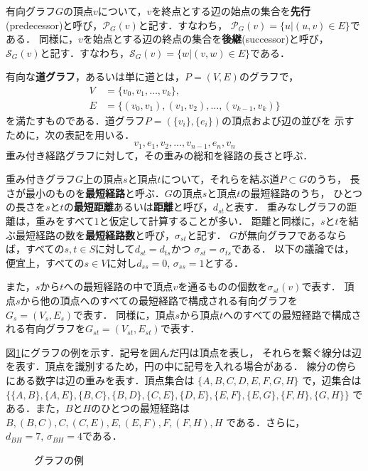 有向グラフ$G$の頂点$v$について，$v$を終点とする辺の始点の集合を\textbf{先行}
(predecessor)と呼び，$\mathcal{P}_G(v)$と記す．すなわち，
$\mathcal{P}_G(v)=\{u|(u,v)\in E\}$である．
同様に，$v$を始点とする辺の終点の集合を\textbf{後継}(successor)と呼び，
$\mathcal{S}_G(v)$と記す．すなわち，$\mathcal{S}_G(v)=\{w|(v,w)\in E\}$である．

有向な\textbf{道グラフ}，あるいは単に道とは，$P=(V,E)$のグラフで，
\begin{equation*}
  \begin{aligned}
  V&=\{v_0,v_1,\ldots,v_k\}, \\
  E&=\{(v_0,v_1),(v_1,v_2),\ldots,(v_{k-1},v_k)\}
  \end{aligned}
\end{equation*}
を満たすものである．道グラフ$P=(\{v_i\},\{e_i\})$の頂点および辺の並びを
示すために，次の表記を用いる．
\[ v_1,e_1,v_2,\ldots,v_{n-1},e_n,v_n \]
重み付き経路グラフに対して，その重みの総和を経路の長さと呼ぶ．

重み付きグラフ$G$上の頂点$s$と頂点$t$について，それらを結ぶ道$P\subset G$のうち，
長さが最小のものを\textbf{最短経路}と呼ぶ．$G$の頂点$s$と頂点$t$の最短経路のうち，
ひとつの長さを$s$と$t$の\textbf{最短距離}あるいは\textbf{距離}と呼び，$d_{st}$と表す．
重みなしグラフの距離は，重みをすべて$1$と仮定して計算することが多い．
距離と同様に，$s$と$t$を結ぶ最短経路の数を\textbf{最短経路数}と呼び，$\sigma_{st}$と記す．
$G$が無向グラフであるならば，すべての$s,t\in S$に対して$d_{st}=d_{ts}$かつ
$\sigma_{st}=\sigma_{ts}$である．
以下の議論では，便宜上，すべての$s\in V$に対し$d_{ss}=0$, $\sigma_{ss}=1$とする．

また，$s$から$t$への最短経路の中で頂点$v$を通るものの個数を$\sigma_{st}(v)$で表す．
頂点$s$から他の頂点へのすべての最短経路で構成される有向グラフを$G_s=(V_s,E_s)$で表す．
同様に，頂点$s$から頂点$t$へのすべての最短経路で構成される有向グラフを$G_{st}=(V_{st},E_{st})$で表す．

\begin{example}
  図\ref{fig:example-graph}にグラフの例を示す．記号を囲んだ円は頂点を表し，
  それらを繋ぐ線分は辺を表す．頂点を識別するため，円の中に記号を入れる場合がある．
  線分の傍らにある数字は辺の重みを表す．頂点集合は
  $\{A,B,C,D,E,F,G,H\}$
  で，辺集合は
  $\{\{A,B\},\{A,E\},\{B,C\},\{B,D\},\{C,E\},\{D,E\},\{E,F\},\{E,G\},\{F,H\},\{G,H\}\}$
  である．また，$B$と$H$のひとつの最短経路は
  $B,(B,C),C,(C,E),E,(E,F),F,(F,H),H$
  である．さらに，$d_{BH}=7,\,\sigma_{BH}=4$である．
  \begin{figure}
    \centering
    \def\svgwidth{.45\textwidth}
    
    \caption{グラフの例}
    \label{fig:example-graph}
  \end{figure}
\end{example}

